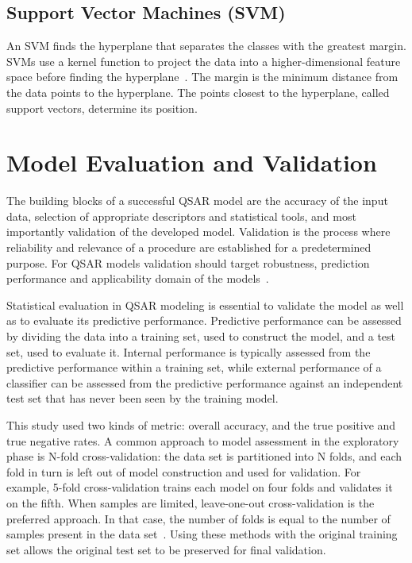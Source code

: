 \subsection{Support Vector Machines (SVM)}
An SVM finds the hyperplane that separates the classes with the greatest margin. SVMs use a kernel function to project the data into a higher-dimensional feature space before finding the hyperplane~\cite{Lapins2013}. The margin is the minimum distance from the data points to the hyperplane. The points closest to the hyperplane, called support vectors, determine its position.

\section{Model Evaluation and Validation}

The building blocks of a successful QSAR model are the accuracy of the input data, selection of appropriate descriptors and statistical tools, and most importantly validation of the developed model. Validation is the process where reliability and relevance of a procedure are established for a predetermined purpose. For QSAR models validation should target robustness, prediction performance and applicability domain of the models~\cite{Lapins2013}.

Statistical evaluation in QSAR modeling is essential to validate the model as well as to evaluate its predictive performance. Predictive performance can be assessed by dividing the data into a training set, used to construct the model, and a test set, used to evaluate it. Internal performance is typically assessed from the predictive performance within a training set, while external performance of a classifier can be assessed from the predictive performance against an independent test set that has never been seen by the training model. 

This study used two kinds of metric: overall accuracy, and the true positive and true negative rates. A common approach to model assessment in the exploratory phase is N-fold cross-validation: the data set is partitioned into N folds, and each fold in turn is left out of model construction and used for validation. For example, 5-fold cross-validation trains each model on four folds and validates it on the fifth. When samples are limited, leave-one-out cross-validation is the preferred approach. In that case, the number of folds is equal to the number of samples present in the data set~\cite{Nantasenamat2009}. Using these methods with the original training set allows the original test set to be preserved for final validation.

